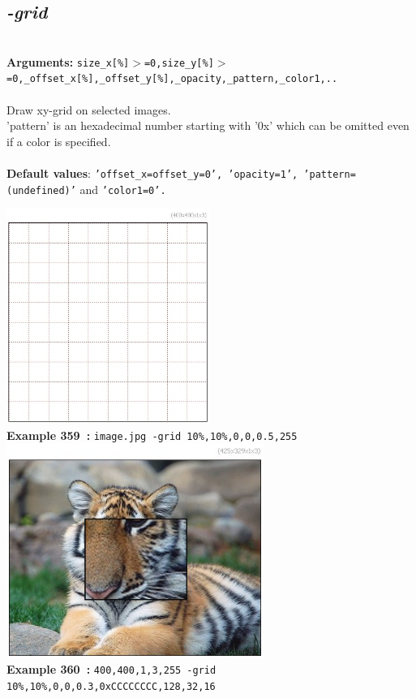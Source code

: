 \documentclass[a4paper,11pt,twoside]{book}
\begin{document}
\subsection{\emph{-grid} }\vspace*{-0.5em}
~\\\textbf{Arguments: } 
{\small \texttt{size\_x[\%]$>$=0,size\_y[\%]$>$=0,\_offset\_x[\%],\_offset\_y[\%],\_opacity,\_pattern,\_color1,..}}\\~\\
Draw xy-grid on selected images.
~\\'pattern' is an hexadecimal number starting with '0x' which can be omitted
even if a color is specified.
~\\~\\\textbf{Default values}: {\small \texttt{'offset\_x=offset\_y=0', 'opacity=1', 'pattern=(undefined)'} and \texttt{'color1=0'.}}
\begin{center}\includegraphics[keepaspectratio=true,height=7cm,width=\textwidth]{img/gmic_def359.jpg}\\
{\footnotesize \textbf{Example 359~:} \texttt{image.jpg -grid 10\%,10\%,0,0,0.5,255}}
\\\includegraphics[keepaspectratio=true,height=7cm,width=\textwidth]{img/gmic_def360.jpg}\\
{\footnotesize \textbf{Example 360~:} \texttt{400,400,1,3,255 -grid 10\%,10\%,0,0,0.3,0xCCCCCCCC,128,32,16}}
\end{center}
\end{document}
